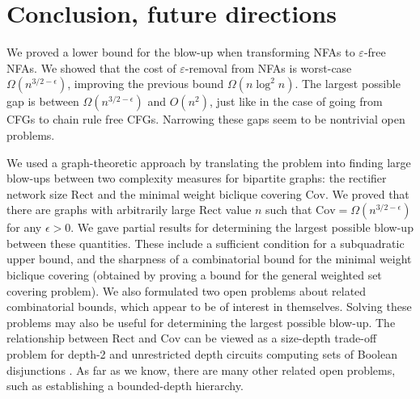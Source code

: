\documentclass[submission]{llncs}
\def\Cov{{\mathrm{Cov}}}
\def\Rect{{\mathrm{Rect}}}
\begin{document}
\section{Conclusion, future directions}
\label{sec-conclusion}

We proved a lower bound for the blow-up when transforming NFAs to $\varepsilon$-free NFAs.
We showed that the cost of $\varepsilon$-removal from NFAs is worst-case $\Omega(n^{3/2-\epsilon})$, improving the
previous bound $\Omega(n\log^2n)$.
The largest possible gap is between $\Omega(n^{3/2-\epsilon})$ and $O(n^2)$, just like in the case of going  from CFGs to chain rule free CFGs.
Narrowing these gaps seem to be nontrivial open problems.

We used a graph-theoretic approach by translating the problem into finding large blow-ups between two complexity measures for
bipartite graphs: the rectifier network size $\Rect$ and the minimal weight biclique covering $\Cov$.
We proved that there are graphs with arbitrarily large $\Rect$ value $n$ such that $\Cov=\Omega(n^{3/2-\epsilon})$ for any $\epsilon>0$.
We gave partial results for determining the largest possible blow-up between these quantities. These include a sufficient condition for
a subquadratic upper bound, and the sharpness of a combinatorial bound for the minimal weight biclique covering (obtained by proving a bound for the general
weighted set covering problem).
We also formulated two open problems about related combinatorial bounds, which appear to be of interest in themselves.
Solving these problems may also be useful for determining the largest possible blow-up.
The relationship between $\Rect$ and $\Cov$ can be viewed as a size-depth trade-off problem for depth-2 and unrestricted depth circuits computing sets of
Boolean disjunctions \cite{Wegener:1987:CBF:35517}.
As far as we know, there are many other related open problems, such as establishing a bounded-depth hierarchy.








{

{}
}
\end{document}

